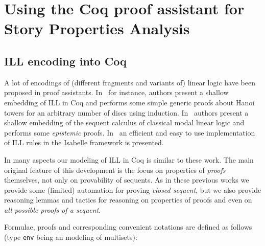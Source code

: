 \documentclass[runningheads,a4paper]{llncs}
\begin{document}
\section{Using the Coq proof assistant for Story Properties Analysis}
\subsection{ILL encoding into Coq}

A lot of encodings of (different fragments and variants of) linear
logic have been proposed in proof assistants. In~\cite{Power99} for
instance, authors present a shallow embedding of ILL in Coq and
performs some simple generic proofs about Hanoi towers for an
arbitrary number of discs using induction.
In~\cite{Sadrzadeh03modallinear} authors present a shallow embedding
of the sequent calculus of classical modal linear logic and performs
some \emph{epistemic} proofs. In~\cite{Kalvala95mechanizinglinear} an
efficient and easy to use implementation of ILL rules in the Isabelle
framework is presented.

In many aspects our modeling of ILL in Coq is similar to these work.
The main original feature of this development is the focus on
properties of \emph{proofs} themselves, not only on provability of
sequents. As in these previous works we provide some (limited)
automation for proving \emph{closed sequent}, but we also provide reasoning lemmas and tactics
for reasoning on properties of proofs and even on \emph{all possible
  proofs of a sequent}. 

Formulae, proofs and corresponding convenient notations are defined as
follows (type \texttt{env} being an modeling of multisets):
\end{document}
